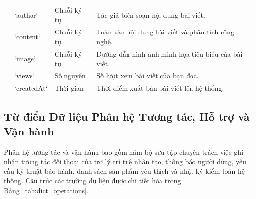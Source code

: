 \begin{table}[H]
\begin{tabularx}{\textwidth}{p{2.5cm}p{2.3cm}p{1.8cm}X}
& `author` & Chuỗi ký tự & Tác giả biên soạn nội dung bài viết. \\
& `content` & Chuỗi ký tự & Toàn văn nội dung bài viết và phân tích công nghệ. \\
& `image` & Chuỗi ký tự & Đường dẫn hình ảnh minh họa tiêu biểu của bài viết. \\
& `views` & Số nguyên & Số lượt xem bài viết của bạn đọc. \\
& `createdAt` & Thời gian & Thời điểm xuất bản bài viết lên hệ thống. \\
\bottomrule
\end{tabularx}
\end{table}

\subsection{Từ điển Dữ liệu Phân hệ Tương tác, Hỗ trợ và Vận hành}
Phân hệ tương tác và vận hành bao gồm năm bộ sưu tập chuyên trách việc ghi nhận tương tác đối thoại của trợ lý trí tuệ nhân tạo, thông báo người dùng, yêu cầu kỹ thuật bảo hành, danh sách sản phẩm yêu thích và nhật ký kiểm toán hệ thống. Cấu trúc các trường dữ liệu được chi tiết hóa trong Bảng~\ref{tab:dict_operations}.

